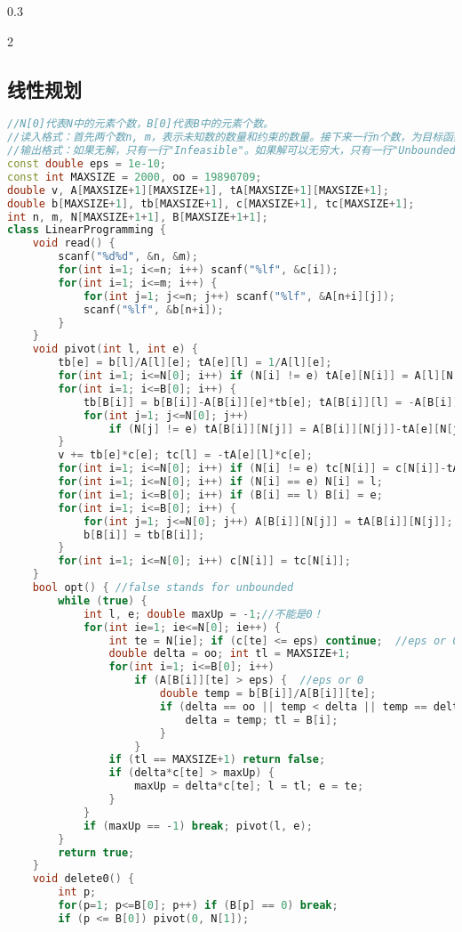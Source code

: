 \documentclass[landscape,a4paper]{article}
\begin{document}
\begin{spacing}{0.3}
\begin{multicols}{2}
	\subsection{线性规划}
\begin{lstlisting}[language=C++]
//N[0]代表N中的元素个数，B[0]代表B中的元素个数。
//读入格式：首先两个数n, m，表示未知数的数量和约束的数量。接下来一行n个数，为目标函数的系数。然后m行，每行m+1个数，表示一个约束。前m个数是系数，最后一个是常数项。
//输出格式：如果无解，只有一行"Infeasible"。如果解可以无穷大，只有一行"Unbounded"。否则，第一行为最大的目标函数值，接下来是每个未知数的值。
const double eps = 1e-10;
const int MAXSIZE = 2000, oo = 19890709;
double v, A[MAXSIZE+1][MAXSIZE+1], tA[MAXSIZE+1][MAXSIZE+1];
double b[MAXSIZE+1], tb[MAXSIZE+1], c[MAXSIZE+1], tc[MAXSIZE+1];
int n, m, N[MAXSIZE+1+1], B[MAXSIZE+1+1];
class LinearProgramming {
	void read() {
		scanf("%d%d", &n, &m);
		for(int i=1; i<=n; i++) scanf("%lf", &c[i]);
		for(int i=1; i<=m; i++) {
			for(int j=1; j<=n; j++) scanf("%lf", &A[n+i][j]);
			scanf("%lf", &b[n+i]);
		}
	}
	void pivot(int l, int e) {
		tb[e] = b[l]/A[l][e]; tA[e][l] = 1/A[l][e];
		for(int i=1; i<=N[0]; i++) if (N[i] != e) tA[e][N[i]] = A[l][N[i]]/A[l][e];
		for(int i=1; i<=B[0]; i++) {
			tb[B[i]] = b[B[i]]-A[B[i]][e]*tb[e]; tA[B[i]][l] = -A[B[i]][e]*tA[e][l];
			for(int j=1; j<=N[0]; j++)
				if (N[j] != e) tA[B[i]][N[j]] = A[B[i]][N[j]]-tA[e][N[j]]*A[B[i]][e];
		}
		v += tb[e]*c[e]; tc[l] = -tA[e][l]*c[e];
		for(int i=1; i<=N[0]; i++) if (N[i] != e) tc[N[i]] = c[N[i]]-tA[e][N[i]]*c[e];
		for(int i=1; i<=N[0]; i++) if (N[i] == e) N[i] = l;
		for(int i=1; i<=B[0]; i++) if (B[i] == l) B[i] = e;
		for(int i=1; i<=B[0]; i++) {
			for(int j=1; j<=N[0]; j++) A[B[i]][N[j]] = tA[B[i]][N[j]];
			b[B[i]] = tb[B[i]];
		}
		for(int i=1; i<=N[0]; i++) c[N[i]] = tc[N[i]];
	}
	bool opt() { //false stands for unbounded
		while (true) {
			int l, e; double maxUp = -1;//不能是0！
			for(int ie=1; ie<=N[0]; ie++) {
				int te = N[ie]; if (c[te] <= eps) continue;  //eps or 0
				double delta = oo; int tl = MAXSIZE+1;
				for(int i=1; i<=B[0]; i++)
					if (A[B[i]][te] > eps) {  //eps or 0
						double temp = b[B[i]]/A[B[i]][te];
						if (delta == oo || temp < delta || temp == delta && B[i] < tl) {
							delta = temp; tl = B[i];
						}
					}
				if (tl == MAXSIZE+1) return false;
				if (delta*c[te] > maxUp) {
					maxUp = delta*c[te]; l = tl; e = te;
				}
			}
			if (maxUp == -1) break; pivot(l, e);
		}
		return true;
	}
	void delete0() {
		int p;
		for(p=1; p<=B[0]; p++) if (B[p] == 0) break;
		if (p <= B[0]) pivot(0, N[1]);

\end{lstlisting}
\end{multicols}
\end{spacing}
\end{document}
